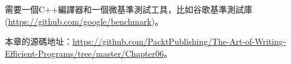 需要一個C++編譯器和一個微基準測試工具，比如谷歌基準測試庫(\url{https://github.com/google/benchmark})。

本章的源碼地址：\url{https://github.com/PacktPublishing/The-Art-of-Writing-Efficient-Programs/tree/master/Chapter06}。